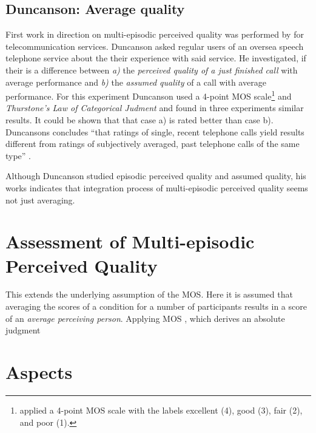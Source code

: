 \subsection{Duncanson: Average quality}
First work in direction on multi-episodic perceived quality was performed by \cite{duncanson_average_1969} for telecommunication services.
Duncanson asked regular users of an oversea speech telephone service about the their experience with said service.
He investigated, if their is a difference between \emph{a)} the \emph{perceived quality of a just finished call} with average performance and \emph{b)} the \emph{assumed quality} of a call with average performance.
For this experiment Duncanson used a 4-point \ac{MOS} scale\footnote{\cite{duncanson_average_1969} applied a 4-point \ac{MOS} scale with the labels excellent (4), good (3), fair (2), and poor (1).} and \emph{Thurstone's Law of Categorical Judment} and found in three experiments similar results.
It could be shown that that case a) is rated better than case b).
Duncansons concludes ``that ratings of single, recent telephone calls
yield results different from ratings of subjectively averaged, past
telephone calls of the same type'' \citep[][p. 116]{duncanson_average_1969}.

Although Duncanson studied episodic perceived quality and assumed quality, his works indicates that integration process of multi-episodic perceived quality seems not just averaging.


\section{Assessment of Multi-episodic Perceived Quality}
This extends the underlying assumption of the \acf{MOS}.
Here it is assumed that averaging the scores of a condition for a number of participants results in a score of an \emph{average perceiving person}.
Applying MOS 
, which derives an absolute judgment 




\section{Aspects}

